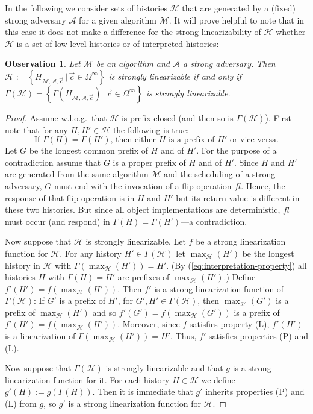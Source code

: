 \documentclass[11pt,letterpaper]{article}
\newtheorem{observation}[theorem]{Observation}
\renewcommand{\AA}{\mathcal{A}}
\newcommand{\HH}{\mathcal{H}}
\newcommand{\MM}{\mathcal{M}}
\newcommand{\vc}{{\vec{c}}}
\begin{document}
In the following we consider sets of histories $\HH$ that are generated by a (fixed) strong adversary $\AA$ for a given algorithm $\MM$.
It will prove helpful to note that in this case it does not make a difference for the strong linearizability of $\HH$ whether $\HH$ is a set of low-level histories or of interpreted histories:
\begin{observation}\label{obs:adversary->interpreted=low-level}
  Let $\MM$ be an algorithm and $\AA$ a strong adversary.
  Then $\HH:=\left\{H_{\MM,\AA,\vc}\,|\,\vc\in\Omega^\infty\right\}$ is strongly linearizable if and only if $\Gamma(\HH)=\left\{\Gamma(H_{\MM,\AA,\vc})\,|\,\vc\in\Omega^\infty\right\}$ is strongly linearizable.
\end{observation}
\begin{proof}
  Assume w.l.o.g.\ that $\HH$ is prefix-closed (and then so is $\Gamma(\HH)$).
  First note that for any $H,H'\in\HH$ the following is true:
  \begin{equation}\label{eq:interpretation-property}
    \text{If $\Gamma(H)=\Gamma(H')$, then either $H$ is a prefix of $H'$ or vice versa.}\tag{$\ast$}
  \end{equation}
  Let $G$ be the longest common prefix of $H$ and of $H'$.
  For the purpose of a contradiction assume that $G$ is a proper prefix of $H$ and of $H'$.
  Since $H$ and $H'$ are generated from the same algorithm $\MM$ and the scheduling of a strong adversary, $G$ must end with the invocation of a flip operation $fl$.
  Hence, the response of that flip operation is in $H$ and $H'$ but its return value is different in these two histories.
  But since all object implementations are deterministic, $fl$ must occur (and respond) in $\Gamma(H)=\Gamma(H')$---a contradiction.

  Now suppose that $\HH$ is strongly linearizable.
  Let $f$ be a strong linearization function for $\HH$.
  For any history $H'\in\Gamma(\HH)$ let $\max_{\HH}(H')$ be the longest history in $\HH$ with $\Gamma(\max_{\HH}(H'))=H'$.
  (By (\ref{eq:interpretation-property}) all histories $H$ with $\Gamma(H)=H'$ are prefixes of $\max_{\HH}(H')$.)
  Define $f'(H')=f(\max_{\HH}(H'))$.
  Then $f'$ is a strong linearization function of $\Gamma(\HH)$:
  If $G'$ is a prefix of $H'$, for $G',H'\in\Gamma(\HH)$, then $\max_{\HH}(G')$ is a prefix of $\max_{\HH}(H')$ and so $f'(G')=f(\max_{\HH}(G'))$ is a prefix of $f'(H')=f(\max_{\HH}(H'))$.
  Moreover, since $f$ satisfies property (L), $f'(H')$ is a linearization of $\Gamma(\max_{\HH}(H'))=H'$. Thus, $f'$ satisfies properties (P) and (L).

  Now suppose that $\Gamma(\HH)$ is strongly linearizable and that $g$ is a strong linearization function for it.
  For each history $H\in\HH$ we define $g'(H):=g(\Gamma(H))$.
  Then it is immediate that $g'$ inherits properties (P) and (L) from $g$, so $g'$ is a strong linearization function for $\HH$.
\end{proof}
\end{document}
